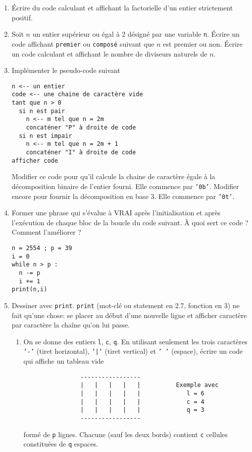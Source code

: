 \begin{enumerate}
 \item \'Ecrire du code calculant et affichant la factorielle d'un entier strictement positif.
 \item Soit $n$ un entier  supérieur ou égal à 2 désigné par une variable \verb|n|. \'Ecrire un code affichant \verb|premier| ou \verb|composé| suivant que $n$ est premier ou non. \'Ecrire un code calculant et affichant le nombre de diviseurs naturels de $n$.
 \item Implémenter le pseudo-code suivant
 \begin{verbatim}
n <-- un entier
code <-- une chaine de caractère vide
tant que n > 0
  si n est pair
    n <-- m tel que n = 2m
    concaténer "P" à droite de code
  si n est impair
    n <-- m tel que n = 2m + 1
    concaténer "I" à droite de code
afficher code
 \end{verbatim}
Modifier ce code pour qu'il calcule la chaine de caractère égale à la décomposition binaire de l'entier fourni. Elle commence par \texttt{'0b'}. Modifier encore pour fournir la décomposition en base 3. Elle commence par \texttt{'0t'}.

 \item Former une phrase qui s'évalue à VRAI après l'initialisation et après l'exécution de chaque bloc de la boucle du code suivant. \`A quoi sert ce code ? Comment l'améliorer ?
 \begin{verbatim}
n = 2554 ; p = 39
i = 0
while n > p :
  n -= p
  i += 1
print(n,i)
 \end{verbatim}
 
\item Dessiner avec \texttt{print}.\newline
\texttt{print} (mot-clé ou statement en 2.7, fonction en 3) ne fait qu'une chose: se placer au début d'une nouvelle ligne et afficher caractère par caractère la chaîne qu'on lui passe.
\begin{enumerate}
  \item On se donne des entiers \texttt{l}, \texttt{c}, \texttt{q}. En utilisant seulement les trois caractères \texttt{'-'} (tiret horizontal), \texttt{'|'} (tiret vertical) et \texttt{' '} (espace), écrire un code qui affiche un tableau vide 
  \begin{verbatim}
                -----------------            
                |   |   |   |   |          Exemple avec
                |   |   |   |   |             l = 6
                |   |   |   |   |             c = 4
                |   |   |   |   |             q = 3   
                -----------------
  \end{verbatim}    
  formé de \texttt{p} lignes. Chacune (sauf les deux bords) contient \texttt{c} cellules constituées de \texttt{q} espaces.
  

\end{enumerate}
\end{enumerate}
